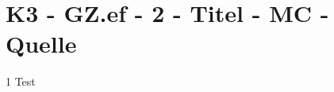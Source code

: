 \section{K3 - GZ.ef - 2 - Titel - MC - Quelle}

\begin{langesbeispiel} \item[1] %
Test
\end{langesbeispiel}